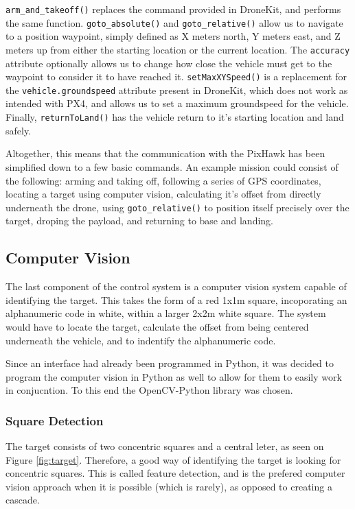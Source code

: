 \documentclass[11pt]{article}
\begin{document}
\lstinline|arm_and_takeoff()| replaces the command provided in DroneKit, and performs the same function. \lstinline|goto_absolute()| and \lstinline|goto_relative()| allow us to navigate to a position waypoint, simply defined as X meters north, Y meters east, and Z meters up from either the starting location or the current location. The \lstinline|accuracy| attribute optionally allows us to change how close the vehicle must get to the waypoint to consider it to have reached it. \lstinline|setMaxXYSpeed()| is a replacement for the \lstinline|vehicle.groundspeed| attribute present in DroneKit, which does not work as intended with PX4, and allows us to set a maximum groundspeed for the vehicle. Finally, \lstinline|returnToLand()| has the vehicle return to it's starting location and land safely.

Altogether, this means that the communication with the PixHawk has been simplified down to a few basic commands. An example mission could consist of the following: arming and taking off, following a series of GPS coordinates, locating a target using computer vision, calculating it's offset from directly underneath the drone, using \lstinline|goto_relative()| to position itself precisely over the target, droping the payload, and returning to base and landing.


\subsection{Computer Vision}
The last component of the control system is a computer vision system capable of identifying the target. This takes the form of a red 1x1m square, incoporating an alphanumeric code in white, within a larger 2x2m white square\cite{IMechE_rules}. The system would have to locate the target, calculate the offset from being centered underneath the vehicle, and to indentify the alphanumeric code.

Since an interface had already been programmed in Python, it was decided to program the computer vision in Python as well to allow for them to easily work in conjucntion. To this end the OpenCV-Python library was chosen.

\subsubsection{Square Detection}
The target consists of two concentric squares and a central leter, as seen on Figure \ref{fig:target}. Therefore, a good way of identifying the target is looking for concentric squares. This is called feature detection, and is the prefered computer vision approach when it is possible (which is rarely), as opposed to creating a cascade.
\end{document}
